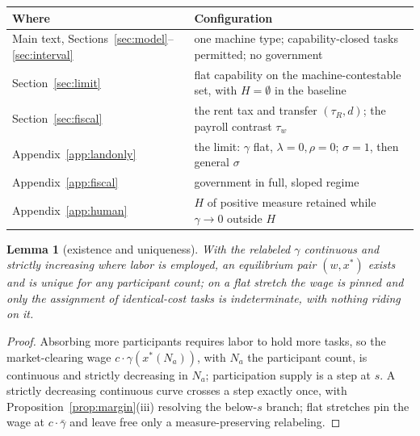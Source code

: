 \documentclass[12pt]{article}
\theoremstyle{plain}
\newtheorem{lemma}[proposition]{Lemma}
\begin{document}
\begin{center}
{\small
\begin{tabular}{l p{8.6cm}}
\toprule
Where & Configuration \\
\midrule
Main text, Sections~\ref{sec:model}--\ref{sec:interval}
& one machine type; capability-closed tasks permitted; no government \\
Section~\ref{sec:limit}
& flat capability on the machine-contestable set, with $H=\emptyset$ in the baseline \\
Section~\ref{sec:fiscal} & the rent tax and transfer $(\tau _R,d)$; the payroll contrast $\tau _w$ \\
Appendix~\ref{app:landonly} & the limit: $\gamma$ flat, $\lambda = 0, \rho = 0$; $\sigma = 1$, then general $\sigma$ \\
Appendix~\ref{app:fiscal} & government in full, sloped regime \\
Appendix~\ref{app:human}
& $H$ of positive measure retained while $\gamma\to0$ outside $H$ \\
\bottomrule
\end{tabular}
}
\end{center}

\begin{lemma}[existence and uniqueness]\label{lem:existence}
With the relabeled $\gamma$ continuous and strictly increasing where labor is employed, an equilibrium pair $(w, x^*)$ exists and is unique for any participant count; on a flat stretch the wage is pinned and only the assignment of identical-cost tasks is indeterminate, with nothing riding on it.
\end{lemma}

\begin{proof}
Absorbing more participants requires labor to hold more tasks, so the market-clearing wage $c\cdot \gamma (x^*(N_a))$, with $N_a$ the participant count, is continuous and strictly decreasing in $N_a$; participation supply is a step at $s$. A strictly decreasing continuous curve crosses a step exactly once, with Proposition~\ref{prop:margin}(iii) resolving the below-$s$ branch; flat stretches pin the wage at $c\cdot \bar{\gamma}$ and leave free only a measure-preserving relabeling.
\end{proof}
\end{document}

